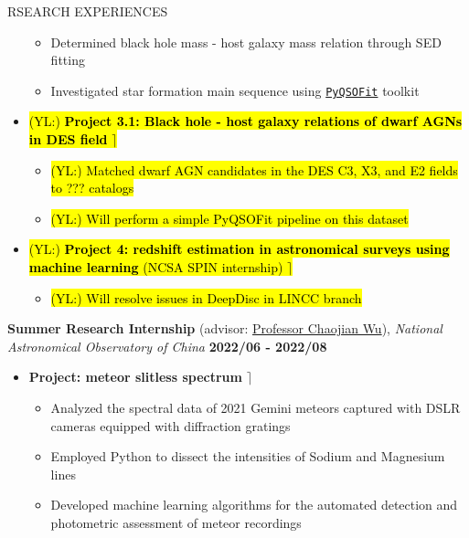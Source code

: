 \documentclass[10pt]{article} %
\DeclareRobustCommand{\yichen}[1]{{\sethlcolor{lime}\hl{(YL:) #1}}}
\begin{document}
\begin{section}{RSEARCH EXPERIENCES}
\begin{itemize}[leftmargin=1.5em]
\begin{itemize}[leftmargin=1.5em]
        \item Determined black hole mass - host galaxy mass relation through SED fitting
        \item Investigated star formation main sequence using \href{https://github.com/legolason/PyQSOFit}{\texttt{PyQSOFit}} toolkit
    \end{itemize}
    \item \yichen{\textbf{Project 3.1: Black hole - host galaxy relations of dwarf AGNs in DES field} \hfill $\rceil$} %
    \begin{itemize}[leftmargin=1.5em]
        \item \yichen{Matched dwarf AGN candidates in the DES C3, X3, and E2 fields to ??? catalogs}
        \item \yichen{Will perform a simple PyQSOFit pipeline on this dataset}
    \end{itemize}
    \item \yichen{\textbf{Project 4: redshift estimation in astronomical surveys using machine learning} (NCSA SPIN internship) \hfill $\rceil$} %
    \begin{itemize}[leftmargin=1.5em]
        \item \yichen{Will resolve issues in DeepDisc in LINCC branch}
    \end{itemize}
\end{itemize}

\textbf{Summer Research Internship} (advisor: \href{mailto:chjwu@bao.ac.cn}{Professor Chaojian Wu}), \textit{National Astronomical Observatory of China} \hfill \textbf{2022/06 - 2022/08} 
\begin{itemize}[leftmargin=1.5em]
    \item \textbf{Project: meteor slitless spectrum} \hfill $\rceil$
    \begin{itemize}[leftmargin=1.5em]
        \item Analyzed the spectral data of 2021 Gemini meteors captured with DSLR cameras equipped with diffraction gratings
        \item Employed Python to dissect the intensities of Sodium and Magnesium lines 
        \item Developed machine learning algorithms for the automated detection and photometric assessment of meteor recordings
    \end{itemize}
\end{itemize}


\end{section}
\end{document}

